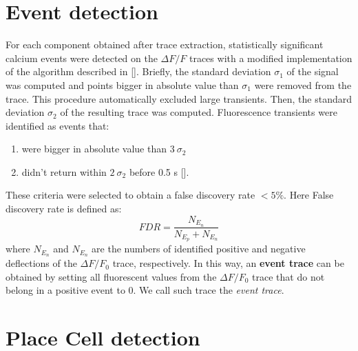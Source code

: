 \section{Event detection}
\label{chap3:sec:6:event_det}
For each component obtained after trace extraction, statistically significant calcium events were detected on  the $\Delta F/F$ traces with a modified implementation of the algorithm described in [\cite{dombeck2007}]. 
Briefly, the standard deviation $\sigma_1$ of the signal was computed and points bigger in absolute value than $\sigma_1$ were removed from the trace. 
This procedure automatically excluded large transients.
Then, the standard deviation $\sigma_2$ of the resulting trace was computed. 
Fluorescence transients were identified as events that:
\begin{enumerate}[label=\roman*)]
    \item were bigger in absolute value than $3\ \sigma_2$ 
    \item didn't return within $2\ \sigma_2$ before 0.5 s [\cite{dombeck2007}].
\end{enumerate}
These criteria were selected to obtain a false discovery rate $< 5\%$.
Here False discovery rate is defined as: 
\begin{equation}
    FDR = \frac{N_{E_n}}{N_{E_p}+N_{E_n}}
\end{equation}
where $N_{E_n}$ and $N_{E_n}$ are the numbers of identified positive and negative deflections of the $\Delta F/F_0$ trace, respectively. 
In this way, an \textbf{event trace} can be obtained by setting all fluorescent values from the $\Delta F/F_0$ trace that do not belong in a positive event to 0. 
We call such trace the \textit{event trace}.

\section{Place Cell detection}
\label{chap3:sec:7:pc_det}
